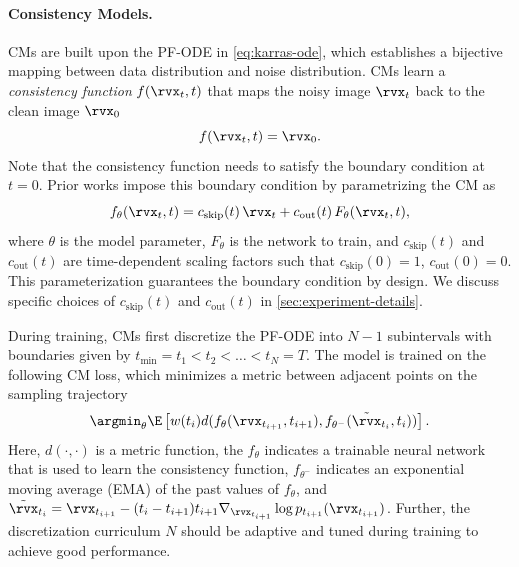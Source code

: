 \documentclass{article}
\begin{document}
\paragraph{Consistency Models.} CMs are built upon the PF-ODE in \cref{eq:karras-ode}, which establishes a bijective mapping between data distribution and noise distribution. 
%
CMs learn a \textit{consistency function} $f(\x_t,t)$ that maps the noisy image $\x_t$ back to the clean image $\x_0$
\begin{equation}
f(\x_t,t) = \x_0.
\end{equation}
Note that the consistency function needs to satisfy the boundary condition at $t = 0$. Prior works \citep{cm,ict,Karras2022edm} impose this boundary condition by parametrizing the CM as
\begin{equation}
f_\theta(\x_t, t) = c_{\text{skip}}(t) \, \x_t + c_{\text{out}}(t) \, F_\theta (\x_t, t),
\end{equation}
where $\theta$ is the model parameter, $F_\theta$ is the network to train, and $c_{\text{skip}}(t)$ and $c_{\text{out}}(t)$ are time-dependent scaling factors such that $c_{\text{skip}}(0) = 1$, $c_{\text{out}}(0) = 0$. 
This parameterization guarantees the boundary condition by design. 
We discuss specific choices of $c_{\text{skip}}(t)$ and $c_{\text{out}}(t)$ in \cref{sec:experiment-details}. 

During training, CMs first discretize the PF-ODE into $N-1$ subintervals with boundaries given by  $t_{\text{min}} = t_1 < t_2 < \hdots < t_N = T$. 
The model is trained on the following CM loss, which minimizes a metric between adjacent points on the sampling trajectory
% 
\begin{equation}
    \argmin_{\theta} \E\left[w(t_i) d(f_\theta(\rvx_{t_{i+1}}, t_{i+1}), f_{\theta^-}(\tilde{\rvx}_{t_{i}}, t_{i}))\right].
\end{equation}
Here, $d(\cdot, \cdot)$ is a metric function, the $f_\theta$ indicates a trainable neural network that is used to learn the consistency function, $f_{\theta^-}$ indicates an exponential moving average (EMA) of the past values of $f_\theta$, and $\tilde{\rvx}_{t_{i}} = \rvx_{t_{i+1}} - (t_{i} - t_{i+1}) t_{i+1} \nabla_{\rvx_{t_{i+1}}} \log p_{t_{i+1}}(\rvx_{t_{i+1}})$. 
Further, the discretization curriculum $N$ should be adaptive and tuned during training to achieve good performance.
\end{document}

